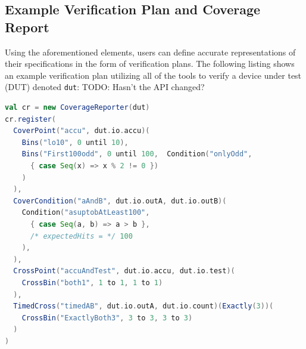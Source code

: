 \documentclass[conference]{IEEEtran}
\newcommand{\todo}[1]{{\color{olive} TODO: #1}}
\begin{document}
\subsection{Example Verification Plan and Coverage Report}%
Using the aforementioned elements, users can define accurate representations of their specifications in the form of verification plans. The following listing shows an example verification plan utilizing all of the tools to verify a device under test (DUT) denoted \texttt{dut}: \todo{Hasn't the API changed?}
\begin{lstlisting}[language=scala]
val cr = new CoverageReporter(dut)
cr.register(
  CoverPoint("accu", dut.io.accu)(
    Bins("lo10", 0 until 10),
    Bins("First100odd", 0 until 100,  Condition("onlyOdd", 
      { case Seq(x) => x % 2 != 0 })
    )
  ),
  CoverCondition("aAndB", dut.io.outA, dut.io.outB)(
    Condition("asuptobAtLeast100", 
      { case Seq(a, b) => a > b }, 
      /* expectedHits = */ 100
    ),
  ),
  CrossPoint("accuAndTest", dut.io.accu, dut.io.test)(
    CrossBin("both1", 1 to 1, 1 to 1)
  ),
  TimedCross("timedAB", dut.io.outA, dut.io.count)(Exactly(3))(
    CrossBin("ExactlyBoth3", 3 to 3, 3 to 3)
  ) 
)
\end{lstlisting}
\end{document}
